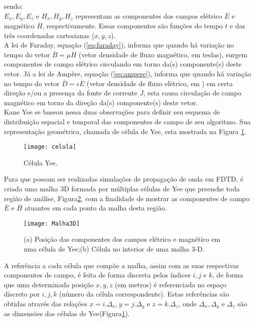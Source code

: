 sendo:\\
$E_x, E_y, E_z$ e $H_x, H_y, H_z$ representam as componentes dos campos elétrico $\overline{E}$ e magnético $\overline{H}$, respectivamente. Essas componentes são funções do tempo $t$ e das três coordenadas cartesianas ($x,y,z$).\\

A lei de Faraday, equação (\ref{eq:faraday}), informa que quando há variação no tempo do vetor $\overline{B}=\mu\overline{H}$ (vetor densidade de fluxo magnético, em teslas), surgem componentes de campo elétrico circulando em torno da(s) componente(s) deste vetor. Já a lei de Ampère, equação (\ref{eq:ampere}), informa que quando há variação no tempo do vetor $\overline{D}=\epsilon\overline{E}$ (vetor densidade de fluxo elétrico, em ) em certa direção e/ou a presença da fonte de corrente $\overline{J}$, esta causa circulação de campo magnético em torno da direção da(s) componente(s) deste vetor.\\
			
Kane Yee se baseou nessa duas observações para definir seu esquema  de distribuição espacial  e temporal das componentes  de campo  de seu algoritmo. Sua representação geométrica, chamada de célula de Yee, esta mostrada na Figura \ref{fg:celulaYee}\cite{rodrigo}.\\
			
\begin{figure}[ht!]
\centering
	\texttt{[image: celula]}
	\caption{Célula Yee.}
	\label{fg:celulaYee}
\end{figure} 
		
Para que possam ser realizadas simulações de propagação de onda em FDTD, é criada uma malha 3D formada por múltiplas células de Yee que preenche toda região de análise, Figura\ref{fg:grade}\cite{almeida}, com a finalidade de mostrar as componentes de campo $\overline{E}$ e $\overline{H}$ atuantes em cada ponto da malha desta região.	\\
\begin{figure}[ht!]
	\centering
	\texttt{[image: Malha3D]}
	\caption{(a) Posição das componentes dos campos elétrico e magnético em uma célula de Yee;(b) Célula no interior de uma malha 3-D.}
	\label{fg:grade}
	\end{figure} 

A referência a cada célula que compõe a malha, assim com as suas respectivas componentes de campo, é feita de forma discreta pelos índices $i, j$ e $k$, de forma que uma determinada posição $x, y, z$ (em metros) é referenciada no espaço discreto por $i, j, k$ (número da célula correspondente). Estas  referências são obtidas através das relações $x = i.\Delta_x, y = j.\Delta_{y}$ e $z = k.\Delta_z$, onde  $\Delta_x,  \Delta_y$ e $\Delta_z$ são as dimensões das células de Yee(Figura\ref{fg:celulaYee}).
